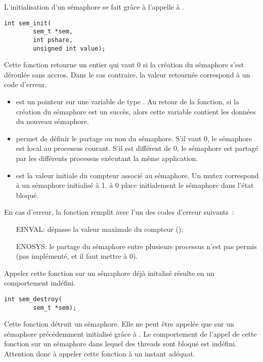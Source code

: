 \label{func:sem_init}
L'initialisation d'un sémaphore se fait grâce à l'appelle à .
\begin{lstlisting}
int sem_init(
		sem_t *sem,
		int pshare,
		unsigned int value);
\end{lstlisting}

Cette fonction retourne un entier qui vaut 0 si la création du sémaphore s'est déroulée sans accros. Dans le cas contraire, la valeur retournée correspond à un code d'erreur.

\begin{itemize}
\item{} est un pointeur sur une variable de type . Au retour de la fonction, si la création du sémaphore est un succès, alors cette variable contient les données du nouveau sémaphore.

\item{} permet de définir le partage ou non du sémaphore. S'il vaut 0, le sémaphore est local au processus courant. S'il est différent de 0, le sémaphore est partagé par les différents processus exécutant la même application.

\item{} est la valeur initiale du compteur associé au sémaphore. Un mutex correspond à un sémaphore initialisé à 1.  à 0 place initialement le sémaphore dans l'état bloqué.
\end{itemize}
En cas d'erreur, la fonction remplit  avec l'un des codes d'erreur suivants~:
\begin{itemize}
\item[EINVAL:]  dépasse la valeur maximale du compteur ();
\item[ENOSYS:] le partage du sémaphore entre plusieurs processus n'est pas permis (pas implémenté, et il faut mettre  à 0).
\end{itemize}
Appeler cette fonction sur un sémaphore déjà initalisé résulte en un comportement indéfini.



\label{func:sem_destroy}

\begin{lstlisting}
int sem_destroy(
		sem_t *sem);
\end{lstlisting}

Cette fonction détruit un sémaphore. Elle ne peut être appelée que sur un sémaphore précédemment initialisé grâce à . Le comportement de l'appel de cette fonction sur un sémaphore dans lequel des threads sont bloqué est indéfini. Attention donc à appeler cette fonction à un instant adéquat.

